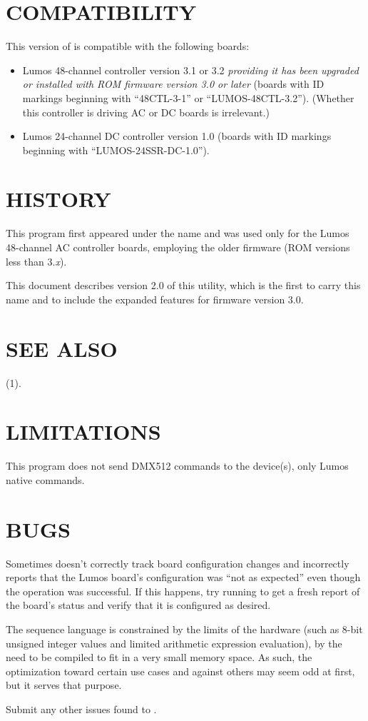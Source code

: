\section*{COMPATIBILITY}


This version of 
is compatible with the following boards:
\begin{itemize}
\item
Lumos 48-channel controller version 3.1 or 3.2
\emph{providing it has been upgraded or installed with ROM firmware version 3.0 or later}
(boards with ID markings beginning with ``48CTL-3-1'' or ``LUMOS-48CTL-3.2'').  (Whether this controller is
driving AC or DC boards is irrelevant.)
\item
Lumos 24-channel DC controller version 1.0 (boards with ID markings beginning with
``LUMOS-24SSR-DC-1.0'').
\end{itemize}
\section*{HISTORY}



This program first appeared under the name
and was used only for the Lumos 48-channel AC controller boards, employing the
older firmware (ROM versions less than
3.\emph{x}).


This document describes version 2.0 of this utility, which is the first to carry
this name and to include the expanded features for firmware version 3.0.
\section*{SEE ALSO}
(1).
\section*{LIMITATIONS}


This program does not send DMX512 commands to the device(s), only Lumos native
commands.
\section*{BUGS}


Sometimes 
doesn't correctly track board configuration changes and incorrectly reports that 
the Lumos board's configuration was ``not as expected'' even though the operation
was successful.  If this happens, try running
to get a fresh report of the board's status and verify that it is configured as desired.


The sequence language is constrained by the limits of the hardware (such as 8-bit
unsigned integer values and limited arithmetic expression evaluation), 
by the need to 
be compiled to fit in a very small memory space.  As such, the optimization
toward certain use cases and against others may seem odd at first, but it serves that
purpose.


Submit any other issues found to 
.
